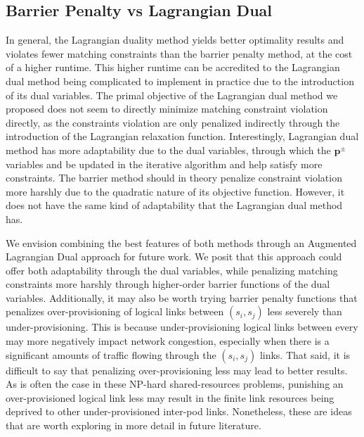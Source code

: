 \documentclass[sigconf]{acmart}
\theoremstyle{definition}
\begin{document}
\subsection{Barrier Penalty vs Lagrangian Dual}
In general, the Lagrangian duality method yields better optimality results and violates fewer matching constraints than the barrier penalty method, at the cost of a higher runtime. This higher runtime can be accredited to the Lagrangian dual method being complicated to implement in practice due to the introduction of its dual variables. The primal objective of the Lagrangian dual method we proposed does not seem to directly minimize matching constraint violation directly, as the constraints violation are only penalized indirectly through the introduction of the Lagrangian relaxation function. Interestingly, Lagrangian dual method has more adaptability due to the dual variables, through which the $\mathbf{p}^\pm$ variables and be updated in the iterative algorithm and help satisfy more constraints. The barrier method should in theory penalize constraint violation more harshly due to the quadratic nature of its objective function. However, it does not have the same kind of adaptability that the Lagrangian dual method has. 

We envision combining the best features of both methods through an Augmented Lagrangian Dual approach for future work. We posit that this approach could offer both adaptability through the dual variables, while penalizing matching constraints more harshly through higher-order barrier functions of the dual variables. Additionally, it may also be worth trying barrier penalty functions that penalizes over-provisioning of logical links between $(s_i, s_j)$ less severely than under-provisioning. This is because under-provisioning logical links between every may more negatively impact network congestion, especially when there is a significant amounts of traffic flowing through the $(s_i, s_j)$ links. That said, it is difficult to say that penalizing over-provisioning less may lead to better results. As is often the case in these NP-hard shared-resources \cite{irving1994three} problems, punishing an over-provisioned logical link less may result in the finite link resources being deprived to other under-provisioned inter-pod links. Nonetheless, these are ideas that are worth exploring in more detail in future literature.
\end{document}
